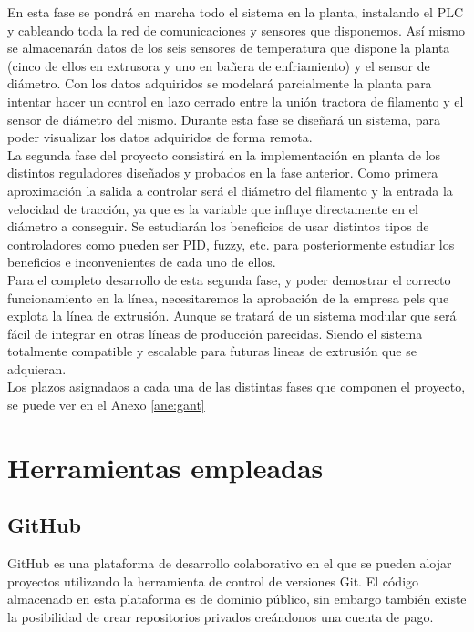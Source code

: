 En esta fase se pondrá en marcha todo el sistema en la planta, instalando el PLC y cableando toda la red de comunicaciones y sensores que disponemos. Así mismo se almacenarán datos de los seis sensores de temperatura que dispone la planta (cinco de ellos en extrusora y uno en bañera de enfriamiento) y el sensor de diámetro. Con los datos adquiridos se modelará parcialmente la planta para intentar hacer un control en lazo cerrado entre la unión tractora de filamento y el sensor de diámetro del mismo. Durante esta fase se diseñará un sistema, para poder visualizar los datos adquiridos de forma remota.\\

La segunda fase del proyecto consistirá en la implementación en planta de los distintos reguladores diseñados y probados en la fase anterior. Como primera aproximación la salida a controlar será el diámetro del filamento y la entrada la velocidad de tracción, ya que es la variable que influye directamente en el diámetro a conseguir. Se estudiarán los beneficios de usar distintos tipos de controladores como pueden ser PID, fuzzy, etc. para posteriormente estudiar los beneficios e inconvenientes de cada uno de ellos.\\

Para el completo desarrollo de esta segunda fase, y poder demostrar el correcto funcionamiento en la línea, necesitaremos la aprobación de la empresa pels que explota la línea de extrusión. Aunque se tratará de un sistema modular que será fácil de integrar en otras líneas de producción parecidas. Siendo el sistema totalmente compatible y escalable para futuras lineas de extrusión que se adquieran.\\

Los plazos asignadaos a cada una de las distintas fases que componen el proyecto, se puede ver en el Anexo \ref{ane:gant}

\section{Herramientas empleadas}
\label{sec:herramientas}

\subsection{GitHub}
GitHub es una plataforma de desarrollo colaborativo en el que se pueden alojar proyectos utilizando la herramienta de control de versiones Git. El código almacenado en esta plataforma es de dominio público, sin embargo también existe la posibilidad de crear repositorios privados creándonos una cuenta de pago.\\

